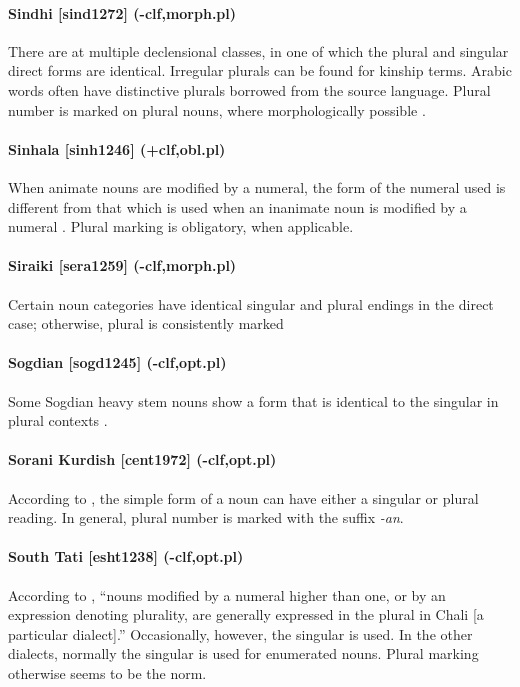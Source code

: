 \paragraph{Sindhi [sind1272] (-clf,morph.pl)}
There are at multiple declensional classes, in one of which the plural and singular direct forms are identical. Irregular plurals can be found for kinship terms. Arabic words often have distinctive plurals borrowed from the source language. Plural number is marked on plural nouns, where morphologically possible \citep[27--8]{Egorova1966}.
\paragraph{Sinhala [sinh1246] (+clf,obl.pl)}
When animate nouns are modified by a numeral, the form of the numeral used is different from that which is used when an inanimate noun is modified by a numeral \citep[60]{Chandralal2010}. Plural marking is obligatory, when applicable.
\paragraph{Siraiki [sera1259] (-clf,morph.pl)}
Certain noun categories have identical singular and plural endings in the direct case; otherwise, plural is consistently marked \citep{Shackle1976}
\paragraph{Sogdian [sogd1245] (-clf,opt.pl)}
Some Sogdian heavy stem nouns show a form that is identical to the singular in plural contexts \citep[313]{Yoshida2009}.
\paragraph{Sorani Kurdish [cent1972] (-clf,opt.pl)}
According to \citet[45-6]{Blau1980}, the simple form of a noun can have either a singular or plural reading. In general, plural number is marked with the suffix {\it -an}.
\paragraph{South Tati [esht1238] (-clf,opt.pl)}
According to \citet[78]{Yarshater1969}, ``nouns modified by a numeral higher than one, or by an expression denoting plurality, are generally expressed in the plural in Chali [a particular dialect].'' Occasionally, however, the singular is used. In the other dialects, normally the singular is used for enumerated nouns. Plural marking otherwise seems to be the norm.
